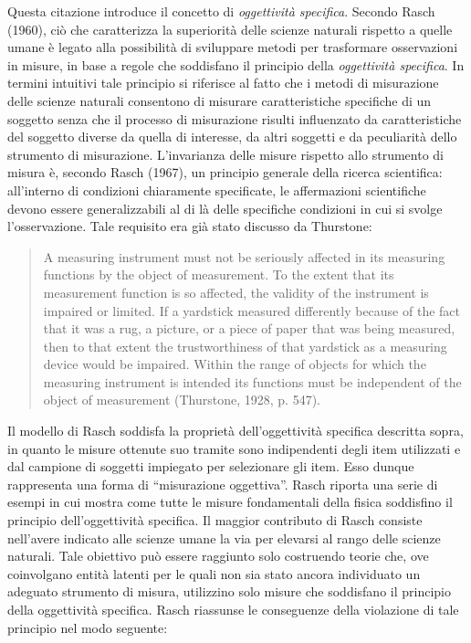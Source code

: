 Questa citazione introduce il concetto di \emph{oggettività specifica}. 
Secondo Rasch (1960), ciò che caratterizza la superiorità delle scienze naturali rispetto a quelle umane è legato alla possibilità di sviluppare metodi per trasformare osservazioni in misure, in base a regole che soddisfano il principio della \emph{oggettività specifica}. In termini intuitivi tale principio si riferisce al fatto che i metodi di misurazione delle scienze naturali consentono di misurare caratteristiche specifiche di un soggetto senza che il processo di misurazione risulti influenzato da caratteristiche del soggetto diverse da quella di interesse, da altri soggetti e da peculiarità dello strumento di misurazione.
L'invarianza delle misure rispetto allo strumento di misura è, secondo Rasch (1967), un principio generale della ricerca scientifica: all'interno di condizioni chiaramente specificate, le affermazioni scientifiche devono essere generalizzabili al di là delle specifiche condizioni in cui si svolge l'osservazione. Tale requisito era già stato discusso da Thurstone: 
\begin{quote}
A measuring instrument must not be seriously affected in its measuring functions by the object of measurement. To the extent that its measurement function is so affected, the validity of the instrument is impaired or limited.  If a yardstick measured differently because of the fact that it was a rug, a picture, or a piece of paper that was being measured, then to that extent the trustworthiness of that yardstick as a measuring device would be impaired. Within the range of objects for which the measuring instrument is intended its functions must be independent of the object of measurement (Thurstone, 1928, p. 547). 
\end{quote}
Il modello di Rasch soddisfa la proprietà dell'oggettività specifica descritta sopra, in quanto le misure ottenute suo tramite sono indipendenti degli item utilizzati e dal campione di soggetti impiegato per selezionare gli item. Esso dunque rappresenta una forma di ``misurazione oggettiva''. Rasch riporta una serie di esempi in cui mostra come tutte le misure fondamentali della fisica soddisfino il principio dell'oggettività specifica. Il maggior contributo di Rasch consiste nell'avere indicato alle scienze umane la via per elevarsi al rango delle scienze naturali. Tale obiettivo può essere raggiunto solo costruendo teorie che, ove coinvolgano entità latenti per le quali non sia stato ancora individuato un adeguato strumento di misura, utilizzino solo misure che soddisfano il principio della oggettività specifica. Rasch riassunse le conseguenze della violazione di tale principio nel modo seguente:
